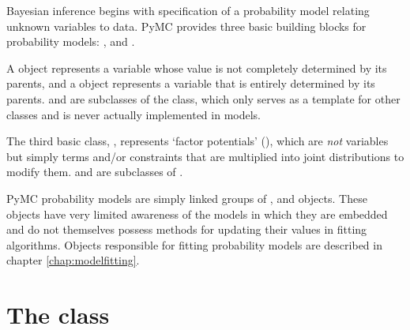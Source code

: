 
Bayesian inference begins with specification of a probability model relating unknown variables to data. PyMC provides three basic building blocks for probability models: ,  and .

A  object represents a variable whose value is not completely determined by its parents, and a  object represents a variable that is entirely determined by its parents.  and  are subclasses of the  class, which only serves as a template for other classes and is never actually implemented in models.

The third basic class, , represents `factor potentials' (\cite{dawidmarkov,Jordan:2004p5439}), which are \emph{not} variables but simply terms and/or constraints that are multiplied into joint distributions to modify them.  and  are subclasses of .



\medskip
PyMC probability models are simply linked groups of ,  and  objects. These objects have very limited awareness of the models in which they are embedded and do not themselves possess methods for updating their values in fitting algorithms. Objects responsible for fitting probability models are described in chapter \ref{chap:modelfitting}.



\section[The Stochastic class]{The  class}
\label{stochastic}


